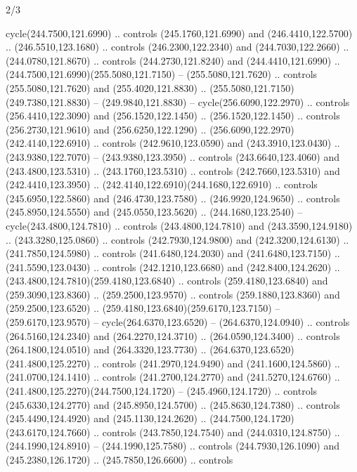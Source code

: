 \begin{flagdescription}{2/3}
\begin{scope}[xshift=0.5\flaglength,yshift=0.5\flagwidth,scale=\flagwidth/259.2]
\begin{scope}[y=0.8pt, x=0.8pt, yscale=-1,shift={(-243,-162)}]
      cycle(244.7500,121.6990) .. controls (245.1760,121.6990) and
      (246.4410,122.5700) .. (246.5510,123.1680) .. controls (246.2300,122.2340) and
      (244.7030,122.2660) .. (244.0780,121.8670) .. controls (244.2730,121.8240) and
      (244.4410,121.6990) .. (244.7500,121.6990)(255.5080,121.7150) --
      (255.5080,121.7620) .. controls (255.5080,121.7620) and (255.4020,121.8830) ..
      (255.5080,121.7150)(249.7380,121.8830) -- (249.9840,121.8830) --
      cycle(256.6090,122.2970) .. controls (256.4410,122.3090) and
      (256.1520,122.1450) .. (256.1520,122.1450) .. controls (256.2730,121.9610) and
      (256.6250,122.1290) .. (256.6090,122.2970)(242.4140,122.6910) .. controls
      (242.9610,123.0590) and (243.3910,123.0430) .. (243.9380,122.7070) --
      (243.9380,123.3950) .. controls (243.6640,123.4060) and (243.4800,123.5310) ..
      (243.1760,123.5310) .. controls (242.7660,123.5310) and (242.4410,123.3950) ..
      (242.4140,122.6910)(244.1680,122.6910) .. controls (245.6950,122.5860) and
      (246.4730,123.7580) .. (246.9920,124.9650) .. controls (245.8950,124.5550) and
      (245.0550,123.5620) .. (244.1680,123.2540) -- cycle(243.4800,124.7810) ..
      controls (243.4800,124.7810) and (243.3590,124.9180) .. (243.3280,125.0860) ..
      controls (242.7930,124.9800) and (242.3200,124.6130) .. (241.7850,124.5980) ..
      controls (241.6480,124.2030) and (241.6480,123.7150) .. (241.5590,123.0430) ..
      controls (242.1210,123.6680) and (242.8400,124.2620) ..
      (243.4800,124.7810)(259.4180,123.6840) .. controls (259.4180,123.6840) and
      (259.3090,123.8360) .. (259.2500,123.9570) .. controls (259.1880,123.8360) and
      (259.2500,123.6520) .. (259.4180,123.6840)(259.6170,123.7150) --
      (259.6170,123.9570) -- cycle(264.6370,123.6520) -- (264.6370,124.0940) ..
      controls (264.5160,124.2340) and (264.2270,124.3710) .. (264.0590,124.3400) ..
      controls (264.1800,124.0510) and (264.3320,123.7730) ..
      (264.6370,123.6520)(241.4800,125.2270) .. controls (241.2970,124.9490) and
      (241.1600,124.5860) .. (241.0700,124.1410) .. controls (241.2700,124.2770) and
      (241.5270,124.6760) .. (241.4800,125.2270)(244.7500,124.1720) --
      (245.4960,124.1720) .. controls (245.6330,124.2770) and (245.8950,124.5700) ..
      (245.8630,124.7380) .. controls (245.4490,124.4920) and (245.1130,124.2620) ..
      (244.7500,124.1720)(243.6170,124.7660) .. controls (243.7850,124.7540) and
      (244.0310,124.8750) .. (244.1990,124.8910) -- (244.1990,125.7580) .. controls
      (244.7930,126.1090) and (245.2380,126.1720) .. (245.7850,126.6600) .. controls

\end{scope}
\end{scope}
\end{flagdescription}

